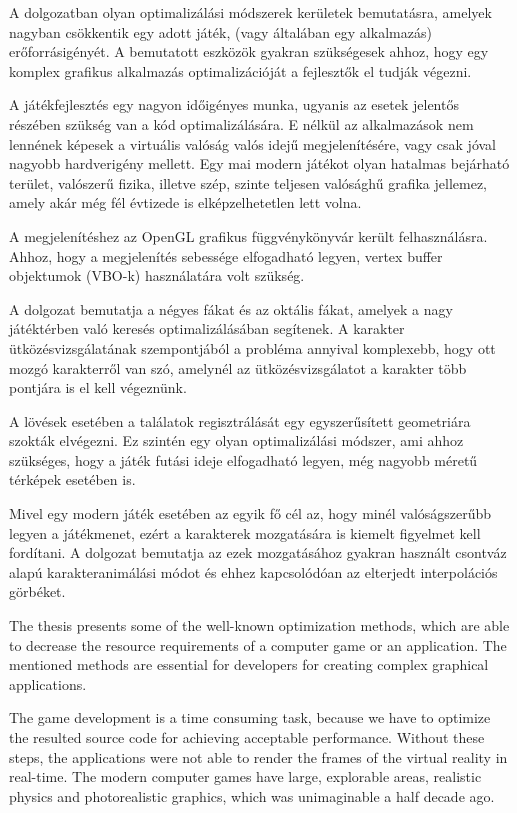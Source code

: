 \label{Chap:osszegzes}

A dolgozatban olyan optimalizálási módszerek kerületek bemutatásra, amelyek \\ nagyban csökkentik egy adott játék, (vagy általában egy alkalmazás) erőforrásigényét. A bemutatott eszközök gyakran szükségesek ahhoz, hogy egy komplex grafikus alkalmazás optimalizációját a fejlesztők el tudják végezni.

A játékfejlesztés egy nagyon időigényes munka, ugyanis az esetek jelentős részében szükség van a kód optimalizálására. E nélkül az alkalmazások nem lennének képesek a virtuális valóság valós idejű megjelenítésére, vagy csak jóval nagyobb hardverigény mellett. Egy mai modern játékot olyan hatalmas bejárható terület, valószerű fizika, illetve szép, szinte teljesen valósághű grafika jellemez, amely akár még fél évtizede is elképzelhetetlen lett volna.

A megjelenítéshez az OpenGL grafikus függvénykönyvár került felhasználásra. Ahhoz, hogy a megjelenítés sebessége elfogadható legyen, vertex buffer objektumok (VBO-k) használatára volt szükség.

A dolgozat bemutatja a négyes fákat és az oktális fákat, amelyek a nagy játéktérben való keresés optimalizálásában segítenek. A karakter ütközésvizsgálatának szempontjából a probléma annyival komplexebb, hogy ott mozgó karakterről van szó, amelynél az ütközésvizsgálatot a karakter több pontjára is el kell végeznünk.

A lövések esetében a találatok regisztrálását egy egyszerűsített geometriára szokták elvégezni. Ez szintén egy olyan optimalizálási módszer, ami ahhoz szükséges, hogy a játék futási ideje elfogadható legyen, még nagyobb méretű térképek esetében is.

Mivel egy modern játék esetében az egyik fő cél az, hogy minél valóságszerűbb legyen a játékmenet, ezért a karakterek mozgatására is kiemelt figyelmet kell fordítani. A dolgozat bemutatja az ezek mozgatásához gyakran használt csontváz alapú karakteranimálási módot és ehhez kapcsolódóan az elterjedt interpolációs görbéket.


The thesis presents some of the well-known optimization methods, which are able to decrease the resource requirements of a computer game or an application. The mentioned methods are essential for developers for creating complex graphical applications.

The game development is a time consuming task, because we have to optimize the resulted source code for achieving acceptable performance. Without these steps, the applications were not able to render the frames of the virtual reality in real-time. The modern computer games have large, explorable areas, realistic physics and photorealistic graphics, which was unimaginable a half decade ago.

